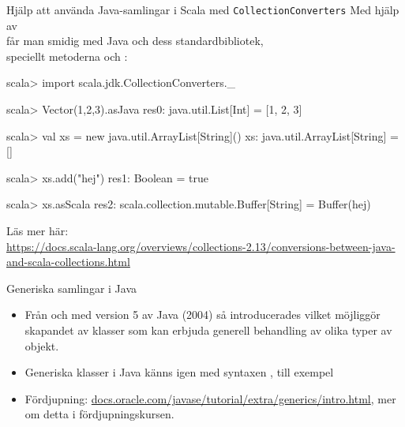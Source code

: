
\begin{Slide}{Hjälp att använda Java-samlingar i Scala med \texttt{CollectionConverters}}\SlideFontSmall
Med hjälp av  \\
får man smidig  med Java och dess standardbibliotek, \\
speciellt metoderna  och :
\begin{REPL}
scala> import scala.jdk.CollectionConverters._

scala> Vector(1,2,3).asJava
res0: java.util.List[Int] = [1, 2, 3]

scala> val xs = new java.util.ArrayList[String]()
xs: java.util.ArrayList[String] = []

scala> xs.add("hej")
res1: Boolean = true

scala> xs.asScala
res2: scala.collection.mutable.Buffer[String] = Buffer(hej)
\end{REPL}

\noindent Läs mer här: %
\ifkompendium\\\fi%
\scriptsize%
\url{https://docs.scala-lang.org/overviews/collections-2.13/conversions-between-java-and-scala-collections.html}

\end{Slide}





\begin{Slide}{Generiska samlingar i Java}
\begin{itemize}
\item Från och med version 5 av Java (2004) så introducerades  vilket möjliggör skapandet av klasser som kan erbjuda generell behandling av olika typer av objekt.

\item Generiska klasser i Java känns igen med syntaxen , till exempel  

\item Fördjupning: \href{https://docs.oracle.com/javase/tutorial/extra/generics/intro.html}{docs.oracle.com/javase/tutorial/extra/generics/intro.html}, mer om detta i fördjupningskursen.

\end{itemize}
\end{Slide}

